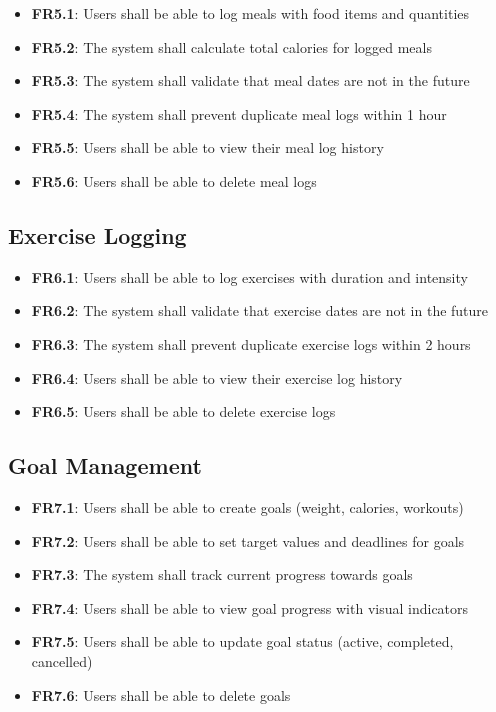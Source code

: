 \begin{itemize}
    \item \textbf{FR5.1}: Users shall be able to log meals with food items and quantities
    \item \textbf{FR5.2}: The system shall calculate total calories for logged meals
    \item \textbf{FR5.3}: The system shall validate that meal dates are not in the future
    \item \textbf{FR5.4}: The system shall prevent duplicate meal logs within 1 hour
    \item \textbf{FR5.5}: Users shall be able to view their meal log history
    \item \textbf{FR5.6}: Users shall be able to delete meal logs
\end{itemize}

\subsection{Exercise Logging}

\begin{itemize}
    \item \textbf{FR6.1}: Users shall be able to log exercises with duration and intensity
    \item \textbf{FR6.2}: The system shall validate that exercise dates are not in the future
    \item \textbf{FR6.3}: The system shall prevent duplicate exercise logs within 2 hours
    \item \textbf{FR6.4}: Users shall be able to view their exercise log history
    \item \textbf{FR6.5}: Users shall be able to delete exercise logs
\end{itemize}

\subsection{Goal Management}

\begin{itemize}
    \item \textbf{FR7.1}: Users shall be able to create goals (weight, calories, workouts)
    \item \textbf{FR7.2}: Users shall be able to set target values and deadlines for goals
    \item \textbf{FR7.3}: The system shall track current progress towards goals
    \item \textbf{FR7.4}: Users shall be able to view goal progress with visual indicators
    \item \textbf{FR7.5}: Users shall be able to update goal status (active, completed, cancelled)
    \item \textbf{FR7.6}: Users shall be able to delete goals
\end{itemize}

